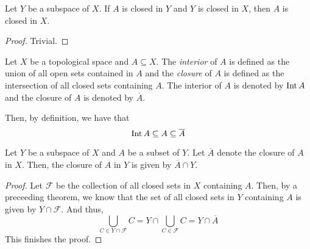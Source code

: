 \begin{corollary}
    Let $Y$ be a subspace of $X$. If $A$ is closed in $Y$ and $Y$ is closed in $X$, then $A$ is closed in $X$.
\end{corollary}
\begin{proof}
    Trivial.
\end{proof}

\begin{definition}
    Let $X$ be a topological space and $A\subseteq X$. The \textit{interior} of $A$ is defined as the union of all open sets contained in $A$ and the \textit{closure} of $A$ is defined as the intersection of all closed sets containing $A$. The interior of $A$ is denoted by $\operatorname{Int} A$ and the closure of $A$ is denoted by $\overline{A}$.
\end{definition}

Then, by definition, we have that 
\begin{equation*}
    \operatorname{Int} A\subseteq A\subseteq\overline{A}
\end{equation*}

\begin{theorem}
    Let $Y$ be a subspace of $X$ and $A$ be a subset of $Y$. Let $\overline{A}$ denote the closure of $A$ in $X$. Then, the closure of $A$ in $Y$ is given by $\overline{A}\cap Y$.
\end{theorem}
\begin{proof}
    Let $\mathcal{F}$ be the collection of all closed sets in $X$ containing $A$. Then, by a preceeding theorem, we know that the set of all closed sets in $Y$ containing $A$ is given by $Y\cap\mathcal{F}$. And thus, 
    \begin{equation*}
        \bigcup_{C\in Y\cap\mathcal{F}} C = Y\cap\bigcup_{C\in\mathcal{F}}C = Y\cap\overline{A}
    \end{equation*}
    This finishes the proof.
\end{proof}

